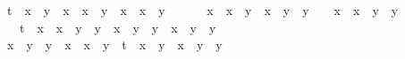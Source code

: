 \begin{isabellebody}
\ \ \ \ t{\isacharcircum}{}\ {\isacharasterisk}\ x{}{\isacharcircum}{}\ {\isacharasterisk}\ y{}{\isacharcircum}{}\ {\isacharminus}\ x{}{\isacharcircum}{}\ {\isacharasterisk}\ x{}{\isacharcircum}{}\ {\isacharasterisk}\ y{}{\isacharcircum}{}\ {\isacharplus}\ x{}{\isacharcircum}{}\ {\isacharasterisk}\ x{}{\isacharcircum}{}\ {\isacharasterisk}\ y{}{\isacharcircum}{}\ {\isacharminus}\ \isanewline
\ \ \ \ x{}{\isacharcircum}{}\ {\isacharasterisk}\ x{}{\isacharcircum}{}\ {\isacharasterisk}\ y{}{\isacharcircum}{}\ {\isacharminus}\ x{}{\isacharcircum}{}\ {\isacharasterisk}\ y{}{\isacharcircum}{}\ {\isacharasterisk}\ y{}{\isacharcircum}{}\ {\isacharplus}\ {}\ {\isacharasterisk}\ x{}{\isacharcircum}{}\ {\isacharasterisk}\ x{}{\isacharcircum}{}\ {\isacharasterisk}\ y{}{\isacharcircum}{}\ {\isacharasterisk}\ y{}{\isacharcircum}{}\ {\isacharminus}\ \isanewline
\ \ \ \ {}\ {\isacharasterisk}\ t{\isacharcircum}{}\ {\isacharasterisk}\ x{}{\isacharcircum}{}\ {\isacharasterisk}\ x{}{\isacharcircum}{}\ {\isacharasterisk}\ y{}{\isacharcircum}{}\ {\isacharasterisk}\ y{}{\isacharcircum}{}\ {\isacharminus}\ x{}{\isacharcircum}{}\ {\isacharasterisk}\ y{}{\isacharcircum}{}\ {\isacharasterisk}\ y{}{\isacharcircum}{}\ {\isacharminus}\ x{}{\isacharcircum}{}\ {\isacharasterisk}\ y{}{\isacharcircum}{}\ {\isacharasterisk}\ y{}{\isacharcircum}{}\ {\isacharplus}\ \isanewline
\ \ \ \ x{}{\isacharcircum}{}\ {\isacharasterisk}\ y{}{\isacharcircum}{}\ {\isacharasterisk}\ y{}{\isacharcircum}{}\ {\isacharminus}\ x{}{\isacharcircum}{}\ {\isacharasterisk}\ x{}{\isacharcircum}{}\ {\isacharasterisk}\ y{}{\isacharcircum}{}\ {\isacharplus}\ t{\isacharcircum}{}\ {\isacharasterisk}\ x{}{\isacharcircum}{}\ {\isacharasterisk}\ y{}{\isacharcircum}{}\ {\isacharplus}\ x{}{\isacharcircum}{}\ {\isacharasterisk}\ y{}{\isacharcircum}{}\ {\isacharasterisk}\ y{}{\isacharcircum}{}\ {\isacharminus}\ \isanewline

\end{isabellebody}
